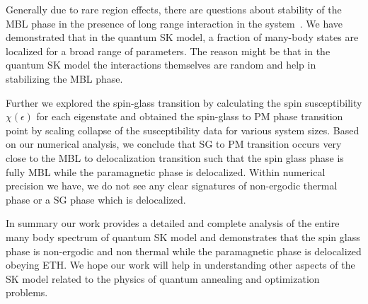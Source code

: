 \documentclass[prl,aps,twocolumn,floats,nofootinbib]{revtex4}
\begin{document}
Generally due to rare region effects, there are questions about stability of the MBL phase in the presence of long range interaction in the system~\cite{Agarwal_rare}. We have demonstrated that in the quantum SK model, a fraction of many-body states are localized for a broad range of parameters. The reason might be that in the quantum SK model the interactions themselves are random and help in stabilizing the MBL phase. 

Further we explored the spin-glass transition by calculating the spin susceptibility $\chi(\epsilon)$ for each eigenstate and obtained the spin-glass to PM phase transition point by scaling collapse of the susceptibility data for various system sizes. Based on our numerical analysis, we conclude that SG to PM transition occurs very close to the MBL to delocalization transition such that the  spin glass phase is fully MBL while the paramagnetic phase is delocalized. Within numerical precision we have, we do not see any clear signatures of non-ergodic thermal phase or a SG phase which is delocalized.

In summary our work provides a detailed and complete analysis of the entire many body spectrum of quantum SK model and demonstrates that the spin glass phase is non-ergodic and non thermal while the paramagnetic phase is delocalized obeying ETH. We hope our work will help in understanding other aspects of the SK model related to the physics of quantum annealing and optimization problems.
\end{document}
